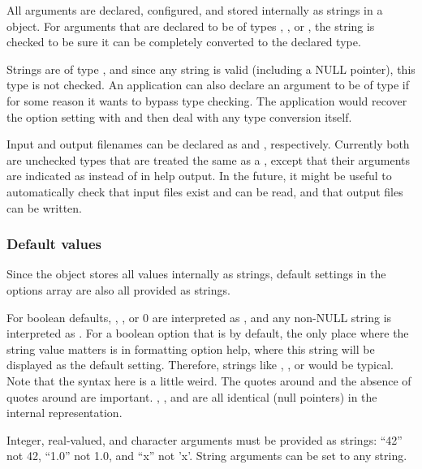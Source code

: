 All arguments are declared, configured, and stored internally as
strings in a  object. For arguments that are
declared to be of types , , or
, the string is checked to be sure it can be
completely converted to the declared type.

Strings are of type , and since any string is
valid (including a NULL pointer), this type is not checked. An
application can also declare an argument to be of type
 if for some reason it wants to bypass type
checking. The application would recover the option setting with
 and then deal with any type
conversion itself.

Input and output filenames can be declared as 
and , respectively. Currently both are unchecked
types that are treated the same as a , except
that their arguments are indicated as  instead of
 in help output. In the future, it might be useful to
automatically check that input files exist and can be read, and that
output files can be written.

   \subsubsection{Default values}

Since the  object stores all values internally as
strings, default settings in the options array are also all provided
as strings.

For boolean defaults, , , or 0 are
interpreted as , and any non-NULL string is interpreted
as .  For a boolean option that is  by
default, the only place where the string value matters is in
formatting option help, where this string will be displayed as the
default setting. Therefore, strings like ,
, or  would be typical. Note that the syntax
here is a little weird. The quotes around  and the
absence of quotes around  are important. ,
, and  are all identical (null pointers) in the
internal representation.

Integer, real-valued, and character arguments must be provided as
strings: ``42'' not 42, ``1.0'' not 1.0, and ``x'' not 'x'.  String
arguments can be set to any string.

